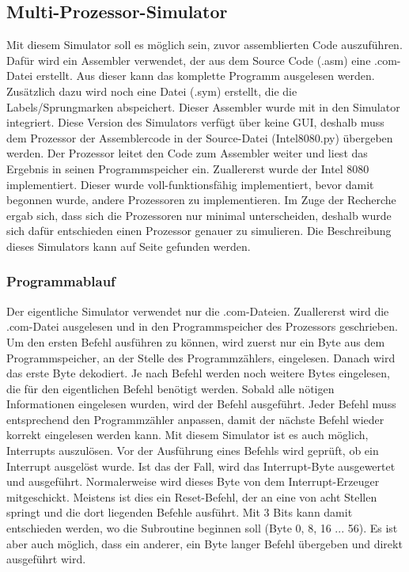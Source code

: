 \documentclass[12pt]{article}
\begin{document}
\subsection{Multi-Prozessor-Simulator}
Mit diesem Simulator soll es möglich sein, zuvor assemblierten Code auszuführen. Dafür wird ein Assembler \cite{Assembler} verwendet, der aus dem Source Code (.asm) eine .com-Datei erstellt. Aus dieser kann das komplette Programm ausgelesen werden. Zusätzlich dazu wird noch eine Datei (.sym) erstellt, die die Labels/Sprungmarken abspeichert. Dieser Assembler wurde mit in den Simulator integriert. Diese Version des Simulators verfügt über keine GUI, deshalb muss dem Prozessor der Assemblercode in der Source-Datei (Intel8080.py) übergeben werden. Der Prozessor leitet den Code zum Assembler weiter und liest das Ergebnis in seinen Programmspeicher ein. 
Zuallererst wurde der Intel 8080 implementiert. Dieser wurde voll-funktionsfähig implementiert, bevor damit begonnen wurde, andere Prozessoren zu implementieren. Im Zuge der Recherche ergab sich, dass sich die Prozessoren nur minimal unterscheiden, deshalb wurde sich dafür entschieden einen Prozessor genauer zu simulieren. Die Beschreibung dieses Simulators kann auf Seite \pageref{SPS_impl} gefunden werden.


\subsubsection{Programmablauf}
Der eigentliche Simulator verwendet nur die .com-Dateien. Zuallererst wird die .com-Datei ausgelesen und in den Programmspeicher des Prozessors geschrieben. Um den ersten Befehl ausführen zu können, wird zuerst nur ein Byte aus dem Programmspeicher, an der Stelle des Programmzählers, eingelesen. Danach wird das erste Byte dekodiert.
Je nach Befehl werden noch weitere Bytes eingelesen, die für den eigentlichen Befehl benötigt werden. Sobald alle nötigen Informationen eingelesen wurden, wird der Befehl ausgeführt. Jeder Befehl muss entsprechend den Programmzähler anpassen, damit der nächste Befehl wieder korrekt eingelesen werden kann. Mit diesem Simulator ist es auch möglich, Interrupts auszulösen. Vor der Ausführung eines Befehls wird geprüft, ob ein Interrupt ausgelöst wurde. Ist das der Fall, wird das Interrupt-Byte ausgewertet und ausgeführt. Normalerweise wird dieses Byte von dem Interrupt-Erzeuger mitgeschickt. Meistens ist dies ein Reset-Befehl, der an eine von acht Stellen springt und die dort liegenden Befehle ausführt. Mit 3 Bits kann damit entschieden werden, wo die Subroutine beginnen soll (Byte 0, 8, 16 ... 56). Es ist aber auch möglich, dass ein anderer, ein Byte langer Befehl übergeben und direkt ausgeführt wird.
\end{document}
